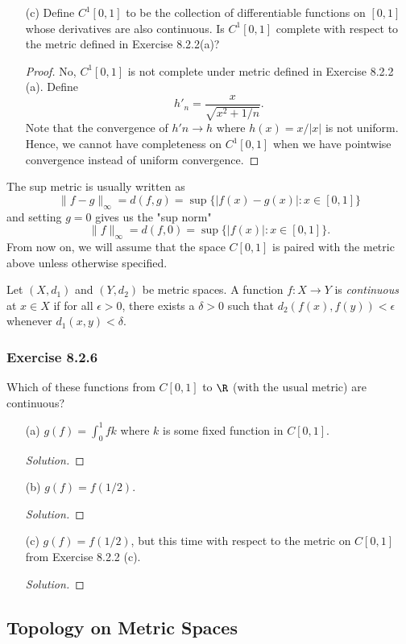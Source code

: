 \begin{enumerate}
    \item[(c)] Define \( C^1[0,1] \) to be the collection of differentiable functions on \( [0,1]  \) whose derivatives are also continuous. Is \( C^{1}[0,1] \) complete with respect to the metric defined in Exercise 8.2.2(a)?
        \begin{proof}
            No, \( C^{1}[0,1] \) is not complete under metric defined in Exercise 8.2.2 (a). Define 
            \[h'_{n} = \frac{ x  }{ \sqrt{ x^{2} + 1/n  }  }. \]
            Note that the convergence of \( h'n \to h  \) where \( h(x) = x / | x |  \) is not uniform. Hence, we cannot have completeness on \( C^{1}[0,1]  \) when we have pointwise convergence instead of uniform convergence.
        \end{proof}
\end{enumerate}

The sup metric is usually written as 
\[  \lVert f -g  \rVert_{\infty }  = d(f,g) = \sup \{ | f(x) - g(x)  | : x \in [0,1] \}  \] and setting \( g = 0  \) gives us the "sup norm" 
\[  \lVert f \rVert_{\infty } = d(f,0 ) = \sup \{ | f(x)  | : x \in [0,1] \} . \]
From now on, we will assume that the space \( C[0,1]  \) is paired with the metric above unless otherwise specified.

\begin{tcolorbox}
\begin{defn}
Let \( (X, d_{1}) \) and \( (Y, d_{2}) \) be metric spaces. A function \( f: X \to Y  \) is \textit{continuous} at \( x \in  X  \) if for all \(\epsilon > 0  \), there exists a \( \delta > 0  \) such that \( d_{2}(f(x) , f(y)) < \epsilon  \) whenever \( d_{1} (x,y) < \delta \).  
\end{defn}
\end{tcolorbox}

\subsubsection{Exercise 8.2.6} Which of these functions from \( C[0,1] \) to \( \R  \) (with the usual metric) are continuous? 
\begin{enumerate}
    \item[(a)] \( g(f) = \int_{ 0 }^{ 1 } f k  \) where \( k   \) is some fixed function in \( C[0,1]  \).
        \begin{proof}[Solution]
        
        \end{proof}
    \item[(b)] \( g(f) = f(1/2) \).
        \begin{proof}[Solution]
        
        \end{proof}
    \item[(c)] \( g(f) = f(1/2)  \), but this time with respect to the metric on \( C[0,1]  \) from Exercise 8.2.2 (c).
        \begin{proof}[Solution]
        
        \end{proof}
\end{enumerate}


\subsection{Topology on Metric Spaces}





